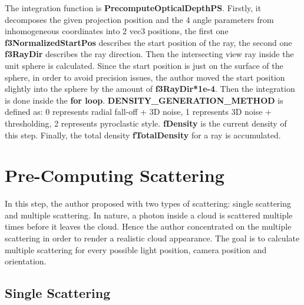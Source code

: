 The integration function is \textbf{PrecomputeOpticalDepthPS}. Firstly, it decomposes the given projection position and the 4 angle parameters from inhomogeneous coordinates into 2 vec3 positions, the first one \textbf{f3NormalizedStartPos} describes the start position of the ray, the second one \textbf{f3RayDir} describes the ray direction. Then the intersecting view ray inside the unit sphere is calculated. Since the start position is just on the surface of the sphere, in order to avoid precision issues, the author moved the start position slightly into the sphere by the amount of \textbf{f3RayDir*1e-4}. Then the integration is done inside the \textbf{for loop}. \textbf{DENSITY\_GENERATION\_METHOD} is defined as: 0 represents radial fall-off + 3D noise, 1 represents 3D noise + thresholding, 2 represents pyroclastic style.
\textbf{fDensity} is the current density of this step. Finally, the total density \textbf{fTotalDensity} for a ray is accumulated.


\section{Pre-Computing Scattering}
In this step, the author proposed with two types of scattering: single scattering and multiple scattering. In nature, a photon inside a cloud is scattered multiple times before it leaves the cloud. Hence the author concentrated on the multiple scattering in order to render a realistic cloud appearance. The goal is to calculate multiple scattering for every possible light position, camera position and orientation.

\subsection{Single Scattering}
